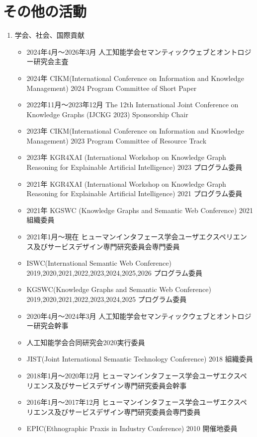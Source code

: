 \documentclass[dvipdfmx]{jlreq}
\begin{document}
\section{その他の活動}
\begin{enumerate}
\item 学会、社会、国際貢献
\begin{itemize}
\item 2024年4月～2026年3月 人工知能学会セマンティックウェブとオントロジー研究会主査
\item 2024年 CIKM(International Conference on Information and Knowledge Management) 2024 Program Committee of Short Paper
\item 2022年11月～2023年12月 The 12th International Joint Conference on Knowledge Graphs (IJCKG 2023) Sponsorship Chair
\item 2023年 CIKM(International Conference on Information and Knowledge Management) 2023 Program Committee of Resource Track
\item 2023年 KGR4XAI (International Workshop on Knowledge Graph Reasoning for Explainable Artificial Intelligence) 2023 プログラム委員
\item 2021年 KGR4XAI (International Workshop on Knowledge Graph Reasoning for Explainable Artificial Intelligence) 2021 プログラム委員
\item 2021年 KGSWC (Knowledge Graphs and Semantic Web Conference) 2021 組織委員
\item 2021年1月～現在 ヒューマンインタフェース学会ユーザエクスペリエンス及びサービスデザイン専門研究委員会専門委員
\item ISWC(International Semantic Web Conference) 2019,2020,2021,2022,2023,2024,2025,2026 プログラム委員
\item KGSWC(Knowledge Graphs and Semantic Web Conference) 2019,2020,2021,2022,2023,2024,2025 プログラム委員
\item 2020年4月～2024年3月 人工知能学会セマンティックウェブとオントロジー研究会幹事
\item 人工知能学会合同研究会2020実行委員
\item JIST(Joint International Semantic Technology Conference) 2018 組織委員
\item 2018年1月～2020年12月 ヒューマンインタフェース学会ユーザエクスペリエンス及びサービスデザイン専門研究委員会幹事
\item 2016年1月～2017年12月 ヒューマンインタフェース学会ユーザエクスペリエンス及びサービスデザイン専門研究委員会専門委員
\item EPIC(Ethnographic Praxis in Industry Conference) 2010 開催地委員

\end{itemize}
\end{enumerate}
\end{document}
